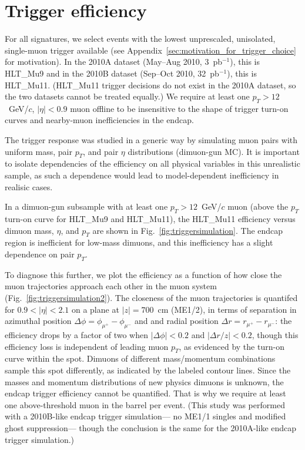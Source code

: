 \documentclass[12pt]{cms-tdr}
\begin{document}
\section{Trigger efficiency}

For all signatures, we select events with the lowest unprescaled,
unisolated, single-muon trigger available (see
Appendix~\ref{sec:motivation_for_trigger_choice} for motivation).  In
the 2010A dataset (May--Aug 2010, 3~pb$^{-1}$), this is HLT\_Mu9 and
in the 2010B dataset (Sep--Oct 2010, 32~pb$^{-1}$), this is HLT\_Mu11.
(HLT\_Mu11 trigger decisions do not exist in the 2010A dataset, so the
two datasets cannot be treated equally.)  We require at least one $p_T
> 12$~GeV/$c$, $|\eta| < 0.9$ muon offline to be insensitive to the
shape of trigger turn-on curves and nearby-muon inefficiencies in the
endcap.

The trigger response was studied in a generic way by simulating muon
pairs with uniform mass, pair $p_T$, and pair $\eta$ distributions
(dimuon-gun MC).  It is important to isolate dependencies of the
efficiency on all physical variables in this unrealistic sample, as
such a dependence would lead to model-dependent inefficiency in
realisic cases.

In a dimuon-gun subsample with at least one $p_T > 12$~GeV/$c$ muon
(above the $p_T$ turn-on curve for HLT\_Mu9 and HLT\_Mu11), the
HLT\_Mu11 efficiency versus dimuon mass, $\eta$, and $p_T$ are shown
in Fig.~\ref{fig:triggersimulation}.  The endcap region is inefficient
for low-mass dimuons, and this inefficiency has a slight dependence on
pair $p_T$.

To diagnose this further, we plot the efficiency as a function of how
close the muon trajectories approach each other in the muon system
(Fig.~\ref{fig:triggersimulation2}).  The closeness of the muon
trajectories is quantifed for $0.9 < |\eta| < 2.1$ on a plane at $|z|
= 700$~cm (ME1/2), in terms of separation in azimuthal position
$\Delta \phi = \phi_{\mu^+} - \phi_{\mu^-}$ and and radial position
$\Delta r = r_{\mu^+} - r_{\mu^-}$: the efficiency drops
by a factor of two when $|\Delta \phi| < 0.2$ and $|\Delta r/z| <
0.2$, though this efficiency loss is independent of leading muon
$p_T$, as evidenced by the turn-on curve within the spot.  Dimuons of
different mass/momentum combinations sample this spot differently, as
indicated by the labeled contour lines.  Since the masses and momentum
distributions of new physics dimuons is unknown, the endcap trigger
efficiency cannot be quantified.  That is why we require at least one
above-threshold muon in the barrel per event.  (This study was
performed with a 2010B-like endcap trigger simulation--- no ME1/1
singles and modified ghost suppression--- though the conclusion is the
same for the 2010A-like endcap trigger simulation.)
\end{document}
